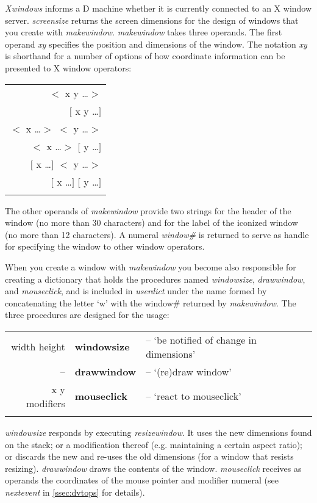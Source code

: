 \emph{Xwindows} informs a D machine whether it is currently connected to an X window server. \emph{screensize} returns the screen dimensions for the design of windows that you create with \emph{makewindow}. \emph{makewindow} takes three operands. The first operand \emph{xy} specifies the position and dimensions of the window. The notation \emph{xy} is shorthand for a number of options of how coordinate information can be presented to X window operators:\\

\begin{tabular}{>{\sffamily}r} 
$<$ x y \ldots $>$\\{}
$[$ x y \ldots $]$\\{}
$<$ x \ldots $>$ $<$ y \ldots $>$ \\{}
$<$ x \ldots $>$ $[$ y \ldots $]$\\{}
$[$ x \ldots $]$ $<$ y \ldots $>$\\{}
$[$ x \ldots $]$ $[$ y \ldots $]$\\{}
\end{tabular}

The other operands of \emph{makewindow} provide two strings for the header of the window (no more than 30 characters) and for the label of the iconized window (no more than 12 characters). A numeral \emph{window\#} is returned to serve as handle for specifying the window to other window operators.

When you create a window with \emph{makewindow} you become also responsible for creating a dictionary that holds the procedures named \emph{windowsize}, \emph{drawwindow}, and \emph{mouseclick}, and is included in \emph{userdict} under the name formed by concatenating the letter `w' with the window\# returned by \emph{makewindow}. The three procedures are designed for the usage:\\

\begin{tabular}{>{\sffamily}r>{\sffamily\bfseries}l>{\sffamily}l}
width height & windowsize & -- `be notified of change in dimensions'\\
-- & drawwindow & -- `(re)draw window'\\
x y modifiers & mouseclick & -- `react to mouseclick'\\\\
\end{tabular}

\emph{windowsize} responds by executing \emph{resizewindow}. It uses the new dimensions found on the stack; or a modification thereof (e.g. maintaining a certain aspect ratio); or discards the new and re-uses the old dimensions (for a window that resists resizing). \emph{drawwindow}  draws the contents of the window. \emph{mouseclick} receives as operands the coordinates of the mouse pointer and modifier numeral (see \emph{nextevent} in \ref{ssec:dvtops} for details).

